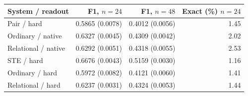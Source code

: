\begin{tabular*}{\linewidth}{@{\extracolsep{\fill}}lrrr@{}}\toprule
System / readout & F1, $n=24$ & F1, $n=48$ & \shortstack{Exact (\%)\\$n=24$}\\\midrule
Pair / hard & 0.5865 (0.0078) & 0.4012 (0.0056) & 1.45\\
Ordinary / native & 0.6327 (0.0045) & 0.4309 (0.0042) & 2.02\\
Relational / native & 0.6292 (0.0051) & 0.4318 (0.0055) & 2.53\\
STE / hard & 0.6676 (0.0043) & 0.5159 (0.0030) & 1.16\\
Ordinary / hard & 0.5972 (0.0082) & 0.4121 (0.0060) & 1.41\\
Relational / hard & 0.6237 (0.0031) & 0.4324 (0.0053) & 1.44\\
\bottomrule\end{tabular*}
